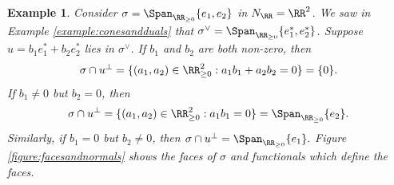 \documentclass[12pt]{amsart}
\theoremstyle{plain}
\newtheorem{example}[theorem]{Example}
\begin{document}
\begin{example}
Consider $\sigma = \Span_{\RR_{\ge 0}} \{e_1, e_2\}$ in $N_\RR = \RR^2$.
We saw in Example \ref{example:conesandduals} that $\sigma^\vee = \Span_{\RR_{\ge 0}}\{e_1^*, e_2^*\}$.
Suppose $u = b_1 e_1^* + b_2 e_2^*$ lies in $\sigma^\vee$.
If $b_1$ and $b_2$ are both non-zero, then
$$\sigma \cap u^\perp = \{(a_1, a_2) \in \RR_{\ge 0}^2 : a_1 b_1 + a_2 b_2 = 0\} = \{0\}.$$
If $b_1 \ne 0$ but $b_2 = 0$, then
$$\sigma \cap u^\perp = \{(a_1, a_2) \in \RR_{\ge 0}^2 : a_1 b_1 = 0\} = \Span_{\RR_{\ge 0}}\{e_2\}.$$
Similarly, if $b_1 = 0$ but $b_2 \ne 0$, then $\sigma \cap u^\perp = \Span_{\RR_{\ge 0}} \{e_1\}.$
Figure \ref{figure:facesandnormals} shows the faces of $\sigma$ and functionals which define the faces.
\end{example}

%            
%            
%
%
%        
%            
%            
%
%
\end{document}
